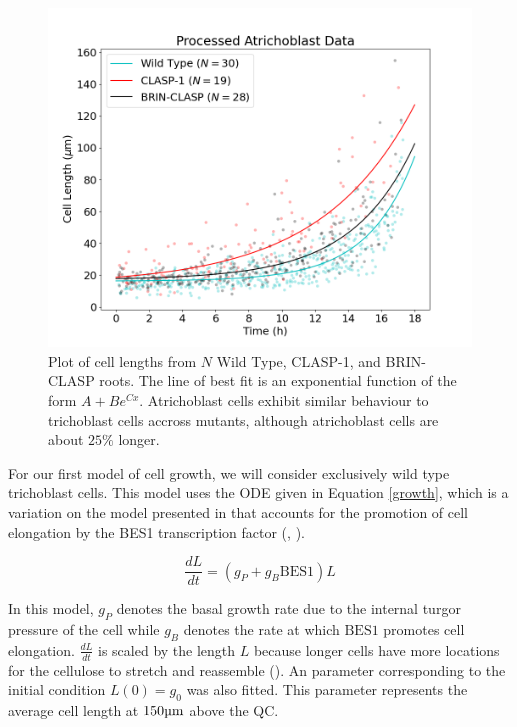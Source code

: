 \begin{figure}[!hbt]
    \centering
    \includegraphics[width=13cm]{img/data-atrichoblast.png}
    \caption{Plot of cell lengths from $N$ Wild Type, CLASP-1, and BRIN-CLASP roots. The line of best fit is an exponential function of the form $A + Be^{Cx}$. Atrichoblast cells exhibit similar behaviour to trichoblast cells accross mutants, although atrichoblast cells are about $25\%$ longer.}
    \label{fig:data-atrichoblast}
\end{figure}

\medskip

For our first model of cell growth, we will consider exclusively wild type trichoblast cells. This model uses the ODE given in Equation \eqref{growth}, which is a variation on the model presented in \cite{lockhart1965} that accounts for the promotion of cell elongation by the BES1 transcription factor (\cite{vukasinovic2021}, \cite{ackerman-lavert2020}).

\begin{equation}
\label{growth}
\frac{dL}{dt} = (g_{P} + g_{B}\text{BES1})L
\end{equation}

In this model, $g_{P}$ denotes the basal growth rate due to the internal turgor pressure of the cell while $g_{B}$ denotes the rate at which $\text{BES1}$ promotes cell elongation. $\frac{dL}{dt}$ is scaled by the length $L$ because longer cells have more locations for the cellulose to stretch and reassemble (\cite{smithers2024}). An parameter corresponding to the initial condition $L(0) = g_{0}$ was also fitted. This parameter represents the average cell length at $150\um$ above the QC. 

